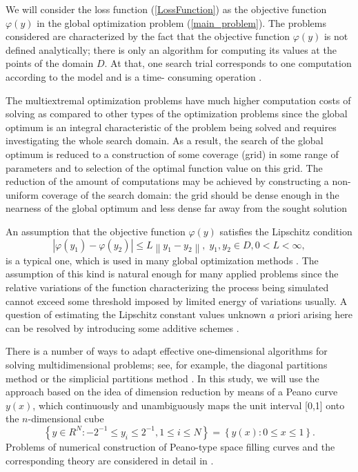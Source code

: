 \documentclass[applsci,article,submit,moreauthors,pdftex]{Definitions/mdpi}
\begin{document}
We will consider the loss function (\ref{LossFunction}) as the objective function $\varphi(y)$ in the global optimization problem (\ref{main_problem}). 
The problems considered are characterized by the fact that the objective function $\varphi(y)$ is not defined analytically; there is only an algorithm for computing its values at the points of the domain $D$. At that, one search trial corresponds to one computation according to the model and is a time- consuming operation \cite{Kalyulin2017,Paulavicius2020}.

The multiextremal optimization problems have much higher computation costs of solving as compared to other types of the optimization problems since the global optimum is an integral characteristic of the problem being solved and requires investigating the whole search domain. As a result, the search of the global optimum is reduced to a construction of some coverage (grid) in some range of parameters and to selection of the optimal function value on this grid. The reduction of the amount of computations may be achieved by constructing a non-uniform coverage of the search domain: the grid should be dense enough in the nearness of the global optimum and less dense far away from the sought solution

An assumption that the objective function $\varphi(y)$ satisfies the Lipschitz condition
\[
\left|\varphi(y_1)-\varphi(y_2)\right|\leq L\left\|y_1-y_2\right\|,\; y_1,y_2 \in D, 0<L<\infty,
\]
is a typical one, which is used in many global optimization methods \cite{Sergeyev2013,Evtushenko2013,Jones2009,Zilinskas2010}.
The assumption of this kind is natural enough for many applied problems since the relative variations of the function characterizing the process being simulated cannot exceed some threshold imposed by limited energy of variations usually. A question of estimating the Lipschitz constant values unknown {\textit a priori} arising here can be resolved by introducing some additive schemes \cite{Strongin2020,Strongin2020_1}.

There is a number of ways to adapt effective one-dimensional algorithms for solving multidimensional problems; see, for example, the diagonal partitions method \cite{Sergeyev2017} or the simplicial partitions method \cite{Zilinskas2014}. In this study, we will use the approach based on the idea of dimension reduction by means of a Peano curve $y(x)$, which continuously and unambiguously maps the unit interval [0,1] onto the $n$-dimensional cube
\[
\left\{y\in R^N: -2^{-1}\leq y_i \leq 2^{-1}, 1 \leq i \leq N\right\}=\left\{y(x):0\leq x \leq 1 \right\}.
\]
Problems of numerical construction of Peano-type space filling curves and the corresponding theory are considered in detail in \cite{Strongin2000,Sergeyev2013}.
\end{document}
